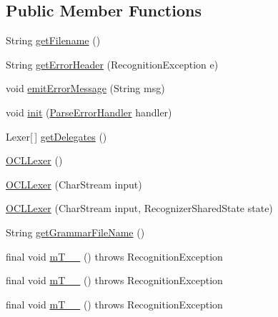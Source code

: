 \subsection*{Public Member Functions}
\begin{DoxyCompactItemize}
\item 
String \hyperlink{classorg_1_1tzi_1_1use_1_1parser_1_1ocl_1_1_o_c_l_lexer_accfdbd0f52f7dd2957034fcb1f8fa1ef}{get\-Filename} ()
\item 
String \hyperlink{classorg_1_1tzi_1_1use_1_1parser_1_1ocl_1_1_o_c_l_lexer_af56a96c7930601771b6f1dde12851610}{get\-Error\-Header} (Recognition\-Exception e)
\item 
void \hyperlink{classorg_1_1tzi_1_1use_1_1parser_1_1ocl_1_1_o_c_l_lexer_a33f8f26a4a7eda16d5e7347ac2bd20ec}{emit\-Error\-Message} (String msg)
\item 
void \hyperlink{classorg_1_1tzi_1_1use_1_1parser_1_1ocl_1_1_o_c_l_lexer_af386713e86938f89d36a49264d9c704d}{init} (\hyperlink{classorg_1_1tzi_1_1use_1_1parser_1_1_parse_error_handler}{Parse\-Error\-Handler} handler)
\item 
Lexer\mbox{[}$\,$\mbox{]} \hyperlink{classorg_1_1tzi_1_1use_1_1parser_1_1ocl_1_1_o_c_l_lexer_ac4cd2faad8a7fdd3d4f64312b682859d}{get\-Delegates} ()
\item 
\hyperlink{classorg_1_1tzi_1_1use_1_1parser_1_1ocl_1_1_o_c_l_lexer_ae5df2edf79c4d153a61a72a01737ad7a}{O\-C\-L\-Lexer} ()
\item 
\hyperlink{classorg_1_1tzi_1_1use_1_1parser_1_1ocl_1_1_o_c_l_lexer_aec1ace9f1ed0cdf61678294d06315c8b}{O\-C\-L\-Lexer} (Char\-Stream input)
\item 
\hyperlink{classorg_1_1tzi_1_1use_1_1parser_1_1ocl_1_1_o_c_l_lexer_ad1a3ac3068515552f6e4d9cfe119e188}{O\-C\-L\-Lexer} (Char\-Stream input, Recognizer\-Shared\-State state)
\item 
String \hyperlink{classorg_1_1tzi_1_1use_1_1parser_1_1ocl_1_1_o_c_l_lexer_a21a6871f4cd364473d6d18b0eca687c7}{get\-Grammar\-File\-Name} ()
\item 
final void \hyperlink{classorg_1_1tzi_1_1use_1_1parser_1_1ocl_1_1_o_c_l_lexer_a2bb578dafdc2d4e43e1f1c80facaf9eb}{m\-T\-\_\-\-\_} ()  throws Recognition\-Exception 
\item 
final void \hyperlink{classorg_1_1tzi_1_1use_1_1parser_1_1ocl_1_1_o_c_l_lexer_a86462f64636b8075545a8eb127df0f31}{m\-T\-\_\-\-\_} ()  throws Recognition\-Exception 
\item 
final void \hyperlink{classorg_1_1tzi_1_1use_1_1parser_1_1ocl_1_1_o_c_l_lexer_a1e2ccc687d28130d83ece1ef327fdd8d}{m\-T\-\_\-\-\_} ()  throws Recognition\-Exception 

\end{DoxyCompactItemize}
